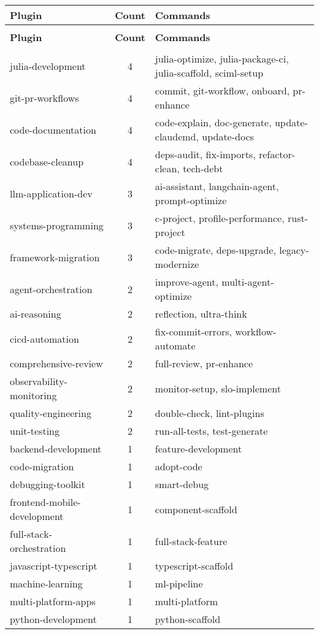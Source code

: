 \documentclass[11pt,a4paper]{article}
\begin{document}
\begin{longtable}{>{\ttfamily}p{} c >{\raggedright\arraybackslash}p{}}
\toprule
\textnormal{\textbf{Plugin}} & \textbf{Count} & \textbf{Commands} \\
\midrule
\endfirsthead
\multicolumn{3}{c}{\textit{Continued from previous page}} \\
\toprule
\textnormal{\textbf{Plugin}} & \textbf{Count} & \textbf{Commands} \\
\midrule
\endhead
\midrule
\multicolumn{3}{r}{\textit{Continued on next page}} \\
\endfoot
\bottomrule
\endlastfoot

julia-development & 4 & julia-optimize, julia-package-ci, julia-scaffold, sciml-setup \\
git-pr-workflows & 4 & commit, git-workflow, onboard, pr-enhance \\
code-documentation & 4 & code-explain, doc-generate, update-claudemd, update-docs \\
codebase-cleanup & 4 & deps-audit, fix-imports, refactor-clean, tech-debt \\
llm-application-dev & 3 & ai-assistant, langchain-agent, prompt-optimize \\
systems-programming & 3 & c-project, profile-performance, rust-project \\
framework-migration & 3 & code-migrate, deps-upgrade, legacy-modernize \\
agent-orchestration & 2 & improve-agent, multi-agent-optimize \\
ai-reasoning & 2 & reflection, ultra-think \\
cicd-automation & 2 & fix-commit-errors, workflow-automate \\
comprehensive-review & 2 & full-review, pr-enhance \\
observability-monitoring & 2 & monitor-setup, slo-implement \\
quality-engineering & 2 & double-check, lint-plugins \\
unit-testing & 2 & run-all-tests, test-generate \\
backend-development & 1 & feature-development \\
code-migration & 1 & adopt-code \\
debugging-toolkit & 1 & smart-debug \\
frontend-mobile-development & 1 & component-scaffold \\
full-stack-orchestration & 1 & full-stack-feature \\
javascript-typescript & 1 & typescript-scaffold \\
machine-learning & 1 & ml-pipeline \\
multi-platform-apps & 1 & multi-platform \\
python-development & 1 & python-scaffold \\
\end{longtable}
\end{document}

